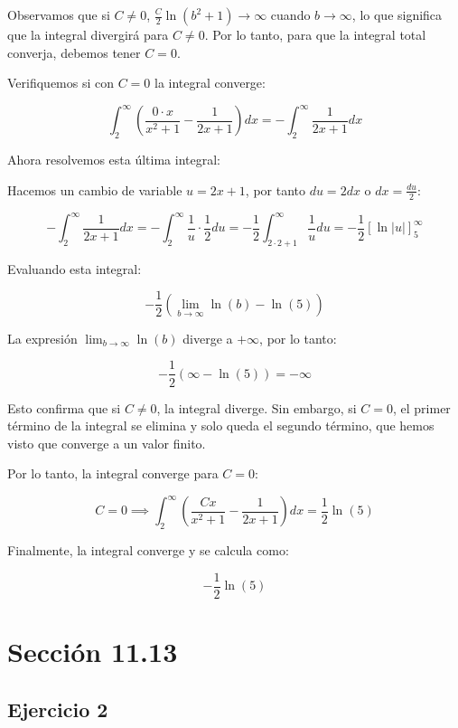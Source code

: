 \documentclass{article}
\begin{document}
    Observamos que si $C \neq 0$, $\frac{C}{2} \ln(b^2 + 1) \to \infty$ cuando $b \to \infty$, lo que significa que la integral divergirá para $C \neq 0$. Por lo tanto, para que la integral total converja, debemos tener $C=0$.

    Verifiquemos si con $C=0$ la integral converge:

    \[
    \int_{2}^{\infty} \left( \frac{0 \cdot x}{x^2 + 1} - \frac{1}{2x + 1} \right) dx = -\int_{2}^{\infty} \frac{1}{2x + 1} dx
    \]

    Ahora resolvemos esta última integral:

    Hacemos un cambio de variable $u = 2x + 1$, por tanto $du = 2 dx$ o $dx = \frac{du}{2}$:

    \[
    - \int_{2}^{\infty} \frac{1}{2x + 1} dx = - \int_{2}^{\infty} \frac{1}{u} \cdot \frac{1}{2} du = -\frac{1}{2} \int_{2 \cdot 2 + 1}^{\infty} \frac{1}{u} du
    = -\frac{1}{2} \left[ \ln |u| \right]_{5}^{\infty}
    \]

    Evaluando esta integral:

    \[
    - \frac{1}{2} \left( \lim_{b \to \infty} \ln(b) - \ln(5) \right)
    \]

    La expresión $\lim_{b \to \infty} \ln(b)$ diverge a $+\infty$, por lo tanto:

    \[
    -\frac{1}{2} \left( \infty - \ln(5) \right) = -\infty
    \]

    Esto confirma que si $C \neq 0$, la integral diverge. Sin embargo, si $C = 0$, el primer término de la integral se elimina y solo queda el segundo término, que hemos visto que converge a un valor finito.

    Por lo tanto, la integral converge para $C = 0$:

    \[
    C = 0 \implies \int_{2}^{\infty}\left(\frac{C x}{x^{2}+1}-\frac{1}{2 x+1}\right) d x = \frac{1}{2} \ln(5)
    \]

    Finalmente, la integral converge y se calcula como:

    \[
    -\frac{1}{2} \ln (5)
    \]

    \section*{Sección 11.13}

    \subsection*{Ejercicio 2}
\end{document}
